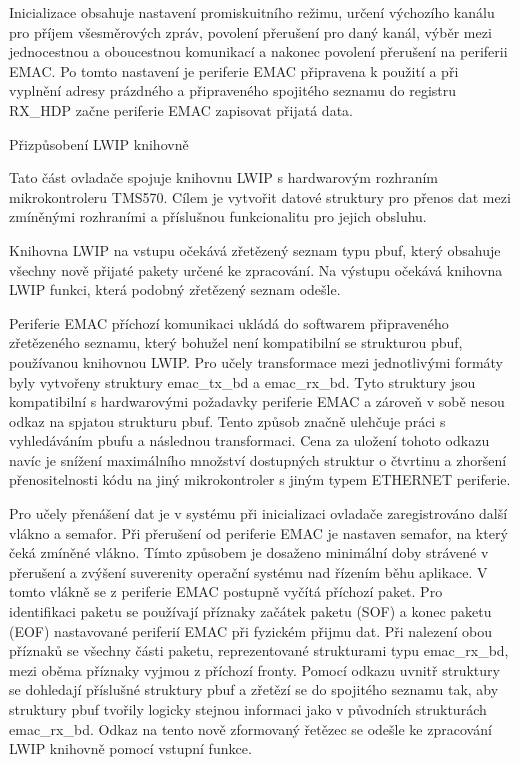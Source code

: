Inicializace obsahuje nastavení promiskuitního režimu, určení výchozího kanálu pro příjem všesměrových zpráv, povolení přerušení pro daný kanál, výběr mezi jednocestnou a oboucestnou komunikací a nakonec povolení přerušení na periferii EMAC. Po tomto nastavení je periferie EMAC připravena k použití a při vyplnění adresy prázdného a připraveného spojitého seznamu do registru RX\_HDP začne periferie EMAC zapisovat přijatá data.

\secc Přizpůsobení LWIP knihovně

Tato část ovladače spojuje knihovnu LWIP s hardwarovým rozhraním mikrokontroleru TMS570. Cílem je vytvořit datové struktury pro přenos dat mezi zmíněnými rozhraními a příslušnou funkcionalitu pro jejich obsluhu.

Knihovna LWIP na vstupu očekává zřetězený seznam typu pbuf, který obsahuje všechny nově přijaté pakety určené ke zpracování. Na výstupu očekává knihovna LWIP funkci, která podobný zřetězený seznam odešle.  

Periferie EMAC příchozí komunikaci ukládá do softwarem připraveného zřetězeného seznamu, který bohužel není kompatibilní se strukturou pbuf, používanou knihovnou LWIP. Pro učely transformace mezi jednotlivými formáty byly vytvořeny struktury emac\_tx\_bd a emac\_rx\_bd. Tyto struktury jsou kompatibilní s hardwarovými požadavky periferie EMAC a zároveň v sobě nesou odkaz na spjatou strukturu pbuf. Tento způsob značně ulehčuje práci s vyhledáváním pbufu a následnou transformaci. Cena za uložení tohoto odkazu navíc je snížení maximálního množství dostupných struktur o čtvrtinu a zhoršení přenositelnosti kódu na jiný mikrokontroler s jiným typem ETHERNET periferie.

Pro učely přenášení dat je v systému při inicializaci ovladače zaregistrováno další vlákno a semafor. Při přerušení od periferie EMAC je nastaven semafor, na který čeká zmíněné vlákno. Tímto způsobem je dosaženo minimální doby strávené v přerušení a zvýšení suverenity operační systému nad řízením běhu aplikace. V tomto vlákně se z periferie EMAC postupně vyčítá příchozí paket. Pro identifikaci paketu se používají příznaky začátek paketu (SOF) a konec paketu (EOF) nastavované periferií EMAC při fyzickém přijmu dat. Při nalezení obou příznaků se všechny části paketu, reprezentované strukturami typu emac\_rx\_bd, mezi oběma příznaky vyjmou z příchozí fronty. Pomocí odkazu uvnitř struktury se dohledají příslušné struktury pbuf a zřetězí se do spojitého seznamu tak, aby struktury pbuf tvořily logicky stejnou informaci jako v původních strukturách emac\_rx\_bd. Odkaz na tento nově zformovaný řetězec se odešle ke zpracování LWIP knihovně pomocí vstupní funkce.

